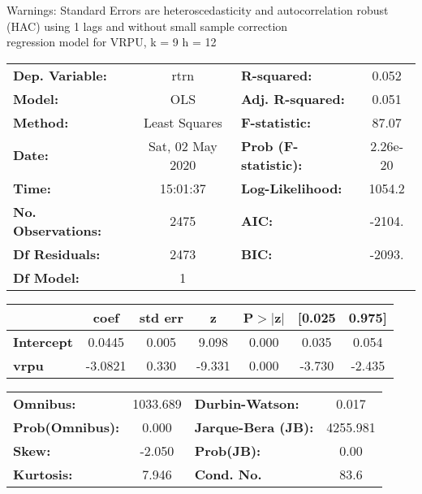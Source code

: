 Warnings: \newline
 [1] Standard Errors are heteroscedasticity and autocorrelation robust (HAC) using 1 lags and without small sample correction\\ 

regression model for VRPU, k = 9 h = 12\begin{center}
\begin{tabular}{lclc}
\toprule
\textbf{Dep. Variable:}    &       rtrn       & \textbf{  R-squared:         } &     0.052   \\
\textbf{Model:}            &       OLS        & \textbf{  Adj. R-squared:    } &     0.051   \\
\textbf{Method:}           &  Least Squares   & \textbf{  F-statistic:       } &     87.07   \\
\textbf{Date:}             & Sat, 02 May 2020 & \textbf{  Prob (F-statistic):} &  2.26e-20   \\
\textbf{Time:}             &     15:01:37     & \textbf{  Log-Likelihood:    } &    1054.2   \\
\textbf{No. Observations:} &        2475      & \textbf{  AIC:               } &    -2104.   \\
\textbf{Df Residuals:}     &        2473      & \textbf{  BIC:               } &    -2093.   \\
\textbf{Df Model:}         &           1      & \textbf{                     } &             \\
\bottomrule
\end{tabular}
\begin{tabular}{lcccccc}
                   & \textbf{coef} & \textbf{std err} & \textbf{z} & \textbf{P$> |$z$|$} & \textbf{[0.025} & \textbf{0.975]}  \\
\midrule
\textbf{Intercept} &       0.0445  &        0.005     &     9.098  &         0.000        &        0.035    &        0.054     \\
\textbf{vrpu}      &      -3.0821  &        0.330     &    -9.331  &         0.000        &       -3.730    &       -2.435     \\
\bottomrule
\end{tabular}
\begin{tabular}{lclc}
\textbf{Omnibus:}       & 1033.689 & \textbf{  Durbin-Watson:     } &    0.017  \\
\textbf{Prob(Omnibus):} &   0.000  & \textbf{  Jarque-Bera (JB):  } & 4255.981  \\
\textbf{Skew:}          &  -2.050  & \textbf{  Prob(JB):          } &     0.00  \\
\textbf{Kurtosis:}      &   7.946  & \textbf{  Cond. No.          } &     83.6  \\
\bottomrule
\end{tabular}
\end{center}

